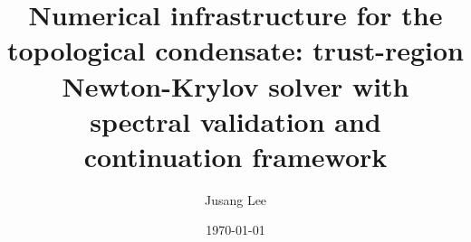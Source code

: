 



\title{Numerical infrastructure for the topological condensate:
trust-region Newton-Krylov solver with spectral validation and
continuation framework}

\author{Jusang Lee}

\date{\today}

